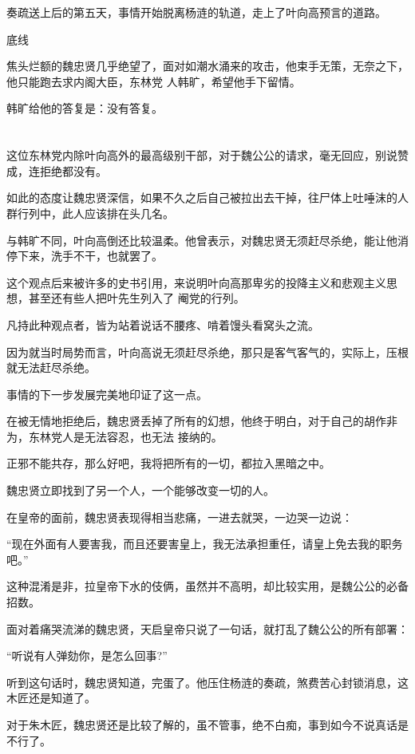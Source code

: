 \documentclass[11pt,a4paper,onecolumn]{article}
\begin{document}
奏疏送上后的第五天，事情开始脱离杨涟的轨道，走上了叶向高预言的道路。

底线

焦头烂额的魏忠贤几乎绝望了，面对如潮水涌来的攻击，他束手无策，无奈之下，他只能跑去求内阁大臣，东林党
人韩旷，希望他手下留情。

韩旷给他的答复是：没有答复。

\section[\thesection]{}

这位东林党内除叶向高外的最高级别干部，对于魏公公的请求，毫无回应，别说赞成，连拒绝都没有。

如此的态度让魏忠贤深信，如果不久之后自己被拉出去干掉，往尸体上吐唾沫的人群行列中，此人应该排在头几名。

与韩旷不同，叶向高倒还比较温柔。他曾表示，对魏忠贤无须赶尽杀绝，能让他消停下来，洗手不干，也就罢了。

这个观点后来被许多的史书引用，来说明叶向高那卑劣的投降主义和悲观主义思想，甚至还有些人把叶先生列入了
阉党的行列。

凡持此种观点者，皆为站着说话不腰疼、啃着馒头看窝头之流。

因为就当时局势而言，叶向高说无须赶尽杀绝，那只是客气客气的，实际上，压根就无法赶尽杀绝。

事情的下一步发展完美地印证了这一点。

在被无情地拒绝后，魏忠贤丢掉了所有的幻想，他终于明白，对于自己的胡作非为，东林党人是无法容忍，也无法
接纳的。

正邪不能共存，那么好吧，我将把所有的一切，都拉入黑暗之中。

魏忠贤立即找到了另一个人，一个能够改变一切的人。

在皇帝的面前，魏忠贤表现得相当悲痛，一进去就哭，一边哭一边说：

``现在外面有人要害我，而且还要害皇上，我无法承担重任，请皇上免去我的职务吧。''

这种混淆是非，拉皇帝下水的伎俩，虽然并不高明，却比较实用，是魏公公的必备招数。

面对着痛哭流涕的魏忠贤，天启皇帝只说了一句话，就打乱了魏公公的所有部署：

``听说有人弹劾你，是怎么回事?''

听到这句话时，魏忠贤知道，完蛋了。他压住杨涟的奏疏，煞费苦心封锁消息，这木匠还是知道了。

对于朱木匠，魏忠贤还是比较了解的，虽不管事，绝不白痴，事到如今不说真话是不行了。
\end{document}
